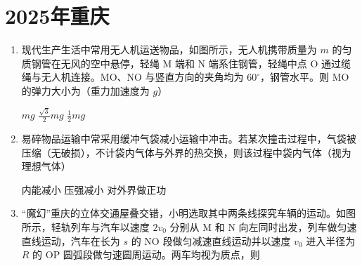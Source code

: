 \documentclass[\gkver]{gaokaozhenti}
\begin{document}
\chapter{2025年重庆}

\begin{enumerate}
\item
现代生产生活中常用无人机运送物品，如图所示，无人机携带质量为 $m$ 的匀质钢管在无风的空中悬停，轻绳 M 端和 N 端系住钢管，轻绳中点 O 通过缆绳与无人机连接。MO、NO 与竖直方向的夹角均为 $60^\circ$，钢管水平。则 MO 的弹力大小为（重力加速度为 $g$）


{$mg$}
{$\frac{\sqrt{3}}{2}mg$}
{$\frac{1}{2}mg$}


\item
易碎物品运输中常采用缓冲气袋减小运输中冲击。若某次撞击过程中，气袋被压缩（无破损），不计袋内气体与外界的热交换，则该过程中袋内气体（视为理想气体）

{内能减小}
{压强减小}
{对外界做正功}


\item
“魔幻”重庆的立体交通屋叠交错，小明选取其中两条线探究车辆的运动。如图所示，轻轨列车与汽车以速度 $2v_{0}$ 分别从 M 和 N 向左同时出发，列车做匀速直线运动，汽车在长为 $s$ 的 NO 段做匀减速直线运动并以速度 $v_{0}$ 进入半径为 $R$ 的 OP 圆弧段做匀速圆周运动。两车均视为质点，则


\end{enumerate}
\end{document}
